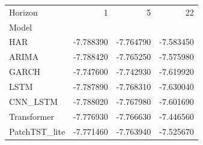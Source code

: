 \begin{tabular}{lrrr}
\toprule
Horizon & 1 & 5 & 22 \\
Model &  &  &  \\
\midrule
HAR & -7.788390 & -7.764790 & -7.583450 \\
ARIMA & -7.788420 & -7.765250 & -7.575980 \\
GARCH & -7.747600 & -7.742930 & -7.619920 \\
LSTM & -7.787890 & -7.768310 & -7.630040 \\
CNN_LSTM & -7.788020 & -7.767980 & -7.601690 \\
Transformer & -7.776930 & -7.766630 & -7.446560 \\
PatchTST_lite & -7.771460 & -7.763940 & -7.525670 \\
\bottomrule
\end{tabular}
